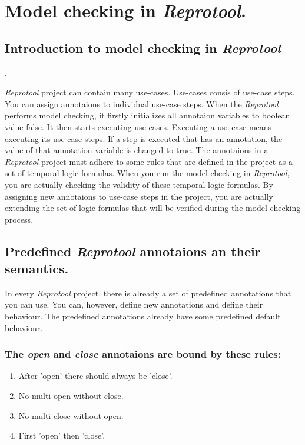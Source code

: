 \section{Model checking in \emph{Reprotool}.}

\subsection{Introduction to model checking in \emph{Reprotool}}.

\emph{Reprotool} project can contain many use-cases. Use-cases consis of use-case steps. You can assign annotaions to individual
use-case steps. When the \emph{Reprotool} performs model checking, it firstly initializes all annotaion variables to boolean value false.
It then starts executing use-cases. Executing a use-case means executing its use-case steps. If a step is executed that has
an annotation, the value of that annotation variable is changed to true. The annotaions in a \emph{Reprotool} project must adhere to
some rules that are defined in the project as a set of temporal logic formulas. When you run the model checking in \emph{Reprotool},
you are actually checking the validity of these temporal logic formulas. By assigning new annotaions to use-case steps in the project,
you are actually extending the set of logic formulas that will be verified during the model checking process.

\subsection{Predefined \emph{Reprotool} annotaions an their semantics.}
In every \emph{Reprotool} project, there is already a set of predefined annotations that you can use. You can, however, define new
annotations and define their behaviour. The predefined annotations already have some predefined default behaviour.

\subsubsection {The \emph{open} and \emph{close} annotaions are bound by these rules:}

\begin{enumerate}
  \item After 'open' there should always be 'close'.
  \item No multi-open without close.
  \item No multi-close without open.
  \item First 'open' then 'close'.
\end{enumerate}

